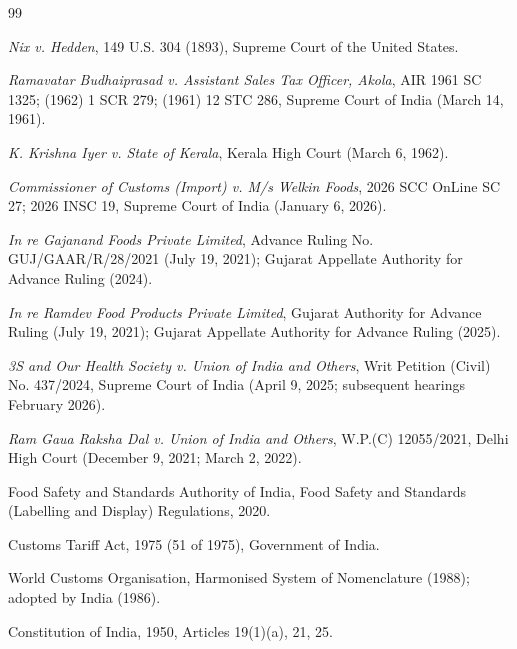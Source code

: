 \documentclass[12pt,a4paper]{article}
\begin{document}
\begin{thebibliography}{99}

\textit{Nix v. Hedden}, 149 U.S. 304 (1893), Supreme Court of the United States.

\textit{Ramavatar Budhaiprasad v. Assistant Sales Tax Officer, Akola}, AIR 1961 SC 1325; (1962) 1 SCR 279; (1961) 12 STC 286, Supreme Court of India (March 14, 1961).

\textit{K. Krishna Iyer v. State of Kerala}, Kerala High Court (March 6, 1962).

\textit{Commissioner of Customs (Import) v. M/s Welkin Foods}, 2026 SCC OnLine SC 27; 2026 INSC 19, Supreme Court of India (January 6, 2026).

\textit{In re Gajanand Foods Private Limited}, Advance Ruling No. GUJ/GAAR/R/28/2021 (July 19, 2021); Gujarat Appellate Authority for Advance Ruling (2024).

\textit{In re Ramdev Food Products Private Limited}, Gujarat Authority for Advance Ruling (July 19, 2021); Gujarat Appellate Authority for Advance Ruling (2025).

\textit{3S and Our Health Society v. Union of India and Others}, Writ Petition (Civil) No. 437/2024, Supreme Court of India (April 9, 2025; subsequent hearings February 2026).

\textit{Ram Gaua Raksha Dal v. Union of India and Others}, W.P.(C) 12055/2021, Delhi High Court (December 9, 2021; March 2, 2022).

Food Safety and Standards Authority of India, Food Safety and Standards (Labelling and Display) Regulations, 2020.

Customs Tariff Act, 1975 (51 of 1975), Government of India.

World Customs Organisation, Harmonised System of Nomenclature (1988); adopted by India (1986).

Constitution of India, 1950, Articles 19(1)(a), 21, 25.

\end{thebibliography}
\end{document}
